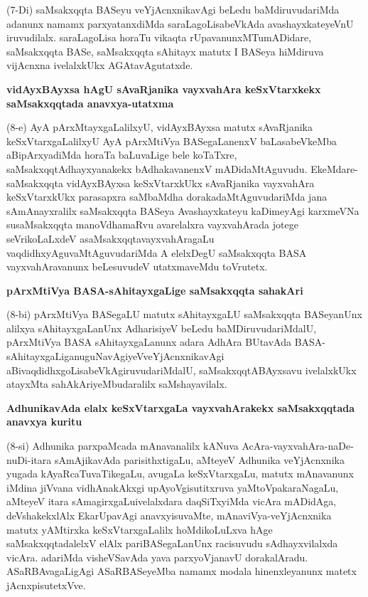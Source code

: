 (7-Di) saMsakxqqta BASeyu veYjAcnxnikavAgi beLedu baMdiruvudariMda adanunx namamx parxyatanxdiMda saraLagoLisabeVkAda avashayxkateyeVnU  iruvudilalx. saraLagoLisa horaTu vikaqta rUpavanunxMTumADi\-dare, saMsakxqqta BASe, saMsakxqqta sAhitayx matutx I BASeya hiMdiruva vijAcnxna ivelalxkUkx AGAtavAgutatxde.

{\medskip
\noindent
{\large\bf vidAyxBAyxsa hAgU sAvaRjanika vayxvahAra keSxVtarxkekx saMsakxqqtada anavxya-\break\-utatxma}}\label{page36}
\smallskip

\noindent
(8-e) AyA pArxMtayxgaLalilxyU, vidAyxBAyxsa matutx sAvaRjanika keSxVtarxgaLalilxyU AyA pArxM\-tiVya BASegaLanenxV baLasabeVkeMba aBipArxyadiMda horaTa baLuvaLige bele koTaTxre, saMsakxqqtAdhayxya\-nakekx bAdhaka\-vanenxV mADidaMtAguvudu. EkeMdare-saMsakxqqta vidAyxBAyxsa keSxVtarxkUkx sAvaRjanika vayxva\-hAra keSxVtarxkUkx parasapxra saMbaMdha dorakadaMtAguvudariMda jana sAmAnayxralilx saMsakxqqta BASeya Avashayx\-kateyu kaDime\-yAgi karxmeVNa susaMsakxqqta manoVdhamaRvu avarelalxra vayxvahArada jotege seVrikoLaLxdeV asaM\-sakxqqta\-vayxvahAragaLu vaqdidhxyAguvaMtAguvudariMda A elelxDegU saMsakxqqta BASA vayxvahAravanunx beLesu\-vudeV utatxmaveMdu toVrutetx.

{\bigskip
\noindent
{\large\bf pArxMtiVya BASA-sAhitayxgaLige saMsakxqqta sahakAri}}\label{page36}
\medskip

\noindent
(8-bi) pArxMtiVya BASegaLU matutx sAhitayxgaLU saMsakxqqta BASeyanUnx alilxya sAhitayx\-gaLanUnx Adha\-risiyeV beLedu baMDiruvudariMdalU, pArxMtiVya BASA sAhitayxgaLanunx adara AdhAra BUta\-vAda BASA-sAhitayxgaLiganuguNavAgiyeV\break veYjAcnx\-nikavAgi aBivaqdidhxgoLisabeVkAgiruvuda\-riMdalU, saMsakxqqtA\-BAyxsavu ivelalxkUkx atayxMta sahAkAriyeMbudaralilx saMshayavilalx.

{\bigskip
\noindent
{\large\bf AdhunikavAda elalx keSxVtarxgaLa vayxvahArakekx saMsakxqqtada anavxya kuritu}}\label{page36}
\medskip

\noindent
(8-si) Adhunika parxpaMcada mAnavanalilx kANuva AcAra-vayxvahAra-naDe-nuDi-\-itara sAmAjika\-vAda parisithxtigaLu, aMteyeV Adhunika veYjAcnxnika yugada kAyaR\-caTuvaTikegaLu, avugaLa keSxVtarxgaLu, matutx mAnavanunx iMdina jiVvana vidhAnakAkxgi upAyoVgisutitxruva yaMtoVpakaraNagaLu, aMteyeV itara sAmagirxgaLu\break ivelalxdara daqSiTxyiMda vicAra mADidAga, deVshakekxlAlx EkarUpavAgi anavxyisu\-vaMte, mAna\-viVya-veYjAcnxnika matutx yAMtirxka keSxVtarxgaLalilx hoMdikoLuLxva hAge saMsakxqqtadalelxV elAlx pariBASe\-gaLanUnx racisuvudu sAdhayxvilalxda vicAra. adariMda visheVSavAda yava parxyoVjanavU dorakalAradu. ASaR\-BAvagaLigAgi ASaR\-BASeyeMba namamx modala hinenxleyanunx matetx jAcnxpisutetxVve.

